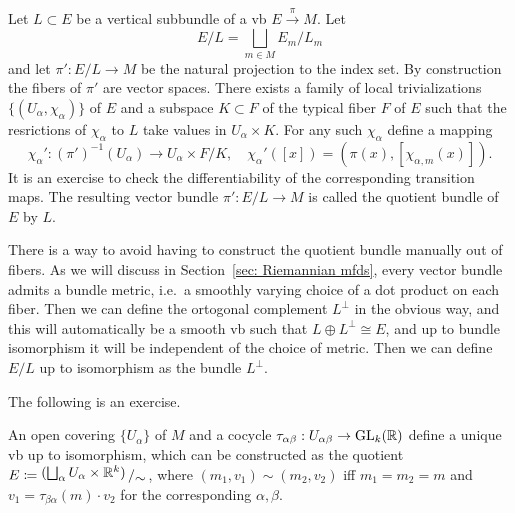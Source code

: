 \begin{defn}
    Let $L\subset E$ be a vertical subbundle of a \gls{vb} $E\overset{\pi}{\to}M$. Let
    \[E\slash L=\bigsqcup_{m\in M}E_m\slash L_m\]
    and let $\pi':E\slash L\to M$ be the natural projection to the index set. By construction the fibers of $\pi'$ are vector spaces. There exists a family of local trivializations $\{(U_\alpha,\chi_\alpha)\}$ of $E$ and a subspace $K\subset F$ of the typical fiber $F$ of $E$ such that the resrictions of $\chi_\alpha$ to $L$ take values in $U_\alpha\times K$. For any such $\chi_\alpha$ define a mapping
    \[\chi_\alpha':(\pi')^{-1}(U_\alpha)\to U_\alpha\times F\slash K,\quad \chi_\alpha'([x])=(\pi(x),[\chi_{\alpha,m}(x)]).\]
    It is an exercise to check the differentiability of the corresponding transition maps. The resulting vector bundle $\pi':E\slash L\to M$ is called the quotient bundle of $E$ by $L$.
\end{defn}
\begin{rem}
    There is a way to avoid having to construct the quotient bundle manually out of fibers. As we will discuss in Section~\ref{sec: Riemannian mfds}, every vector bundle admits a bundle metric, i.e.~a smoothly varying choice of a dot product on each fiber. Then we can define the ortogonal complement $L^\perp$ in the obvious way, and this will automatically be a smooth \gls{vb} such that $L\oplus L^\perp\cong E$, and up to bundle isomorphism it will be independent of the choice of metric. Then we can define $E\slash L$ up to isomorphism as the bundle $L^\perp$.
\end{rem}


The following is an exercise.
\begin{prop}
    An open covering $\{U_\alpha\}$ of $M$ and a cocycle $\tau_{\alpha\beta}:U_{\alpha\beta}\to\operatorname{GL}_k (\mathbb{R} )$ define a unique \gls{vb} up to isomorphism, which can be constructed as the quotient $E\coloneqq \bigslant{(\bigsqcup_\alpha U_\alpha \times \bbR^k)}{\sim}$, where $(m_1,v_1)\sim(m_2,v_2)$ iff $m_1=m_2=m$ and $v_1=\tau_{\beta\alpha}(m)\cdot v_2$ for the corresponding $\alpha,\beta$.
\end{prop}




